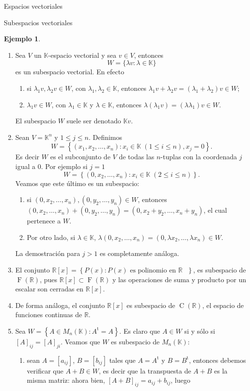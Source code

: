 \documentclass[a4paper,12pt,twoside,spanish,reqno]{amsbook}
\theoremstyle{definition}
\newtheorem{ejemplo}{Ejemplo}[section]
\theoremstyle{remark}
\renewcommand{\t}{{\operatorname{t}}}
\newcommand{\R}{\mathbb R}
\newcommand{\K}{\mathbb K}
\begin{document}
\begin{chapter}{Espacios vectoriales}
\begin{section}{Subespacios vectoriales}
\begin{ejemplo}
\begin{enumerate}
		\item Sea $V$ un $\K$-espacio vectorial y sea $v \in V$, entonces
		$$
		W = \{\lambda v: \lambda \in \K \}
		$$
		es un subespacio vectorial. En  efecto
		\begin{enumerate}
			\item si $\lambda_1v,\lambda_2v \in W$, con $\lambda_1,\lambda_2 \in \K$,  entonces $\lambda_1v + \lambda_2v = (\lambda_1+\lambda_2)v \in W$;
			\item  $\lambda_1v \in W$, con $\lambda_1 \in \K$ y $\lambda \in \K$,  entonces $\lambda(\lambda_1v) = (\lambda \lambda_1)v \in W$.
		\end{enumerate}
		El subespacio $W$ suele ser denotado $\K v$.
	
		
		\item Sean $V=\K^n$ y $1\le j \le n$. Definimos 
		$$
		W = \left\{ (x_1,x_2,\ldots,x_n): x_i \in \K\; (1 \le i \le n), x_j =0\right\}.
		$$
		Es decir $W$  es el subconjunto de $V$ de todas las $n$-tuplas con la coordenada $j$ igual a 0. Por ejemplo  si $j=1$ 
		$$
		W = \left\{ (0,x_2,\ldots,x_n): x_i \in \K \;(2 \le i \le n)\right\}.
		$$
		Veamos que este último es un subespacio: 
		\begin{enumerate}
			\item si $(0,x_2,\ldots,x_n), (0,y_2,\ldots,y_n) \in W$,  entonces
			$(0,x_2,\ldots,x_n)+ (0,y_2,\ldots,y_n) = (0,x_2+y_2,\ldots,x_n+y_n)$, el cual pertenece a $W$. 
			\item 	Por otro lado, si $\lambda \in \K$, $\lambda(0,x_2,\ldots,x_n) = (0,\lambda x_2,\ldots,\lambda x_n) \in W$.
		\end{enumerate}
		La demostración para $j >1$ es completamente análoga. 
		\item El  conjunto $\R[x] = \left\{P(x): P(x) \text{ es polinomio en $\R$ } \right\}$, es subespacio de $\operatorname{F}(\R)$, pues $\R[x] \subset \operatorname{F}(\R)$ y las operaciones de suma y producto por un escalar son cerradas en $\R[x]$.
		\item De forma análoga, el conjunto $\R[x]$ es subespacio de $\operatorname{C}(\R)$,  el espacio de funciones continuas de  $\R$.
		\item Sea $W= \left\{A \in M_n(\K): A^\t = A \right\}$. Es claro que  $A \in W$ si y sólo si $[A]_{ij} = [A]_{ji}$. Veamos que  $W$ es subespacio de $M_n(\K)$: 
		\begin{enumerate}
			\item sean $A=[a_{ij}]$, $B= [b_{ij}]$ tales que $A=A^\t$ y $B=B^\t$, entonces debemos verificar que $A+ B \in W$,  es decir que la transpuesta de $A+B$  es la misma matriz: ahora bien, $[A+B]_{ij} = a_{ij}+b_{ij}$, luego 

\end{enumerate}
\end{enumerate}
\end{ejemplo}
\end{section}
\end{chapter}
\end{document}
